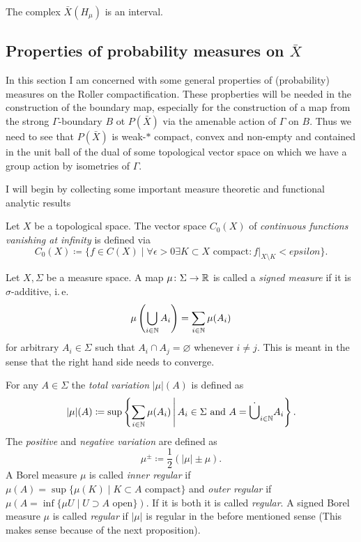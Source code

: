 \begin{lemma}[{\cite[Lem. 4.7]{MR3509968}}]
  The complex \(\bar X(H_\mu)\) is an interval.
\end{lemma}

\subsection{Properties of probability measures on \(\bar X\)}
\label{sec:prob}

In this section I am concerned with some general properties of (probability) measures on the Roller compactification. These propberties will be needed in the construction of the boundary map, especially for the construction of a map from the strong \(\Gamma\)-boundary \(B\) ot \(P(\bar X)\) via the amenable action of \(\Gamma\) on \(B\). Thus we need to see that \(P(\bar X)\) is weak-\(\ast\) compact, convex and non-empty and contained in the unit ball of the dual of some topological vector space on which we have a group action by isometries of \(\Gamma\).

I will begin by collecting some important measure theoretic and functional analytic results

\begin{defin}
  Let \(X\) be a topological space. The vector space \(C_0(X)\) of \emph{continuous functions vanishing at infinity} is defined via
  \[
    C_0(X) \coloneqq \{f \in C(X) \mid \forall \epsilon > 0 \exists K \subset X \text{ compact}\colon f|_{X\setminus K} < epsilon\}.
  \]
\end{defin}

\begin{defin}
  Let \(X, \Sigma\) be a measure space. A map \(\mu \colon \Sigma \to \mathbb{R}\) is called a \emph{signed measure} if it is \(\sigma\)-additive, i.\,e.
  \[
    \mu\left(\bigcup_{i \in \mathbb{N}}A_i \right) = \sum_{i \in \mathbb{N}} \mu(A_i)
  \]
  for arbitrary \(A_i \in \Sigma\) such that \(A_i \cap A_j = \varnothing\) whenever \(i \neq j\). This is meant in the sense that the right hand side needs to converge.

  For any \(A \in \Sigma\) the \emph{total variation} \(|\mu|(A)\) is defined as
  \[
    |\mu|(A) \coloneqq \sup \left\{\sum_{i \in \mathbb{N}} \mu(A_i) \,\middle|\, A_i \in \Sigma \text{ and } A = \dot \bigcup_{i \in \mathbb{N}} A_i \right \}.
  \]
  The \emph{positive} and \emph{negative variation} are defined as
  \[
    \mu^\pm \coloneqq \frac12 (|\mu| \pm \mu).
  \]
  A Borel measure \(\mu\) is called \emph{inner regular} if \(\mu(A) = \sup \{ \mu(K) \mid K \subset A \text{ compact}\}\) and \emph{outer regular} if \(\mu(A = \inf \{ \mu{U} \mid U \supset A \text{ open}\})\). If it is both it is called \emph{regular}. A signed Borel measure \(\mu\) is called \emph{regular} if \(|\mu|\) is regular in the before mentioned sense (This makes sense because of the next proposition).
\end{defin}


